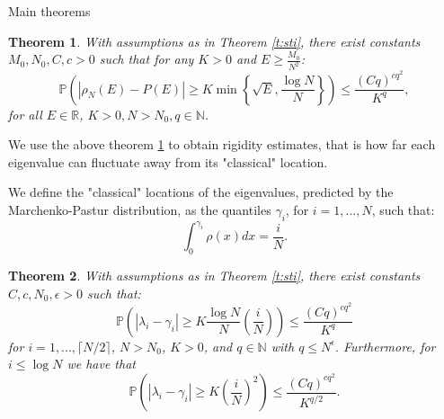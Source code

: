 \documentclass[11pt, a4paper, oneside]{book}
\numberwithin{equation}{chapter}
\newtheorem{thm}{Theorem}[section]
\begin{document}
\begin{section}{Main theorems}
\begin{thm}\label{t:counting}
With assumptions as in Theorem \ref{t:sti}, there exist constants $M_0, N_0, C, c >0$ such that for any $K > 0$ and $E \geq \frac{M_0}{N^2}$:
%
\begin{equation}\label{e:counting}
\mathbb{P}\left(|\rho_N(E) - P(E)| \geq K \min \left\{\sqrt {E}, \frac{ \log N}{N}\right\}\right) \leq \frac{(Cq)^{cq^2}}{K^q},
\end{equation}
for all $E\in \mathbb{R}$, $K>0, N>N_0, q\in \mathbb{N}$.
%
\end{thm}
%
We use the above theorem \ref{t:counting} to obtain rigidity estimates, that is how far each eigenvalue can fluctuate away from its "classical" location.

We define the "classical" locations of the eigenvalues, predicted by the Marchenko-Pastur distribution, as the quantiles $\gamma_i$, for $i=1,...,N$, such that:
\[
\int_0^{\gamma_i} \rho(x) dx = \frac{i}{N}.
\]
%
\begin{thm}\label{t:rigidity}
With assumptions as in Theorem \ref{t:sti}, there exist constants $C,c,N_0,\epsilon>0$ such that:
%
\begin{equation} \label{e:rigiditybulk}\mathbb{P} \left ( | \lambda_i  - \gamma_i | \geq K \frac{ \log N}{N} \left ( \frac{i}{N}  \right )\right) \leq \frac{(Cq)^{cq^2}}{K^q} \end{equation}
for $i=1,...,\lceil N/2 \rceil$, $N>N_0$, $K>0$, and $q \in \mathbb{N}$ with $q\leq N^\epsilon.$
Furthermore, for $i \leq \log N$ we have that
\begin{equation} \label{e:rigidityedge}\mathbb{P} \left ( | \lambda_i  - \gamma_i | \geq K \left ( \frac{ i}{N}\right)^2 \right ) \leq \frac{(Cq)^{cq^2}}{K^{q/2}}. 
\end{equation}
%
\end{thm}
%
%
\end{section}
%
%
\end{document}
